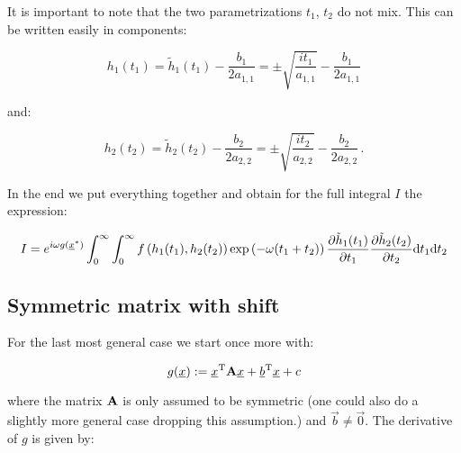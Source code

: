 \documentclass[a4paper,10pt]{article}
\begin{document}
It is important to note that the two parametrizations $t_1$, $t_2$ do not mix.
This can be written easily in components:

\begin{equation}
 h_1(t_1) = \tilde{h}_1(t_1) - \frac{b_1}{2 a_{1,1}}
          = \pm \sqrt{\frac{i t_1}{a_{1,1}}} - \frac{b_1}{2 a_{1,1}}
\end{equation}

and:

\begin{equation}
 h_2(t_2) = \tilde{h}_2(t_2) - \frac{b_2}{2 a_{2,2}}
          = \pm \sqrt{\frac{i t_2}{a_{2,2}}} - \frac{b_2}{2 a_{2,2}} \,.
\end{equation}

%

In the end we put everything together and obtain for the full integral $I$
the expression:


\begin{equation}
 I = e^{i \omega g\left(\underline{x}^{*}\right)}
     \int_0^\infty \int_0^\infty
       f\left(h_1(t_1), h_2(t_2)\right)
       \exp\left(-\omega (t_1 + t_2)\right)
       \frac{\partial \tilde{h}_1(t_1)}{\partial t_1}
       \frac{\partial \tilde{h}_2(t_2)}{\partial t_2}
     \mathrm{d}t_1 \mathrm{d}t_2
\end{equation}


\subsection{Symmetric matrix with shift}
\label{sec:mv_sym_full}


For the last most general case we start once more with:

\begin{equation}
 g(\underline{x}) := \underline{x}{}^{\textnormal{T}} \mathbf{A} \underline{x} + \underline{b}{}^{\textnormal{T}} \underline{x} + c
\end{equation}

where the matrix $\mathbf{A}$ is only assumed to be symmetric (one
could also do a slightly more general case dropping this assumption.)
and $\vec{b} \neq \vec{0}$. The derivative of $g$ is given by:
\end{document}
